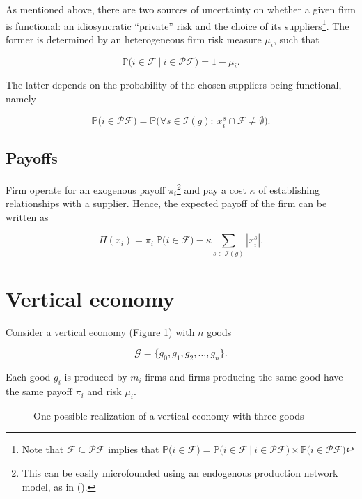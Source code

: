 \documentclass[american, abstract=on]{scrartcl}
\newcommand{\inputTikZ}[2]{%
      \scalebox{#1}{}  
    }
\newcommand{\F}{\mathcal{F}}
\newcommand{\G}{\mathcal{G}}
\newcommand{\I}{\mathcal{I}}
\newcommand{\PF}{\mathcal{P} \F}
\renewcommand{\P}{\mathbb{P}}
\newcommand{\abs}[1]{\left\lvert#1\right\rvert}
\newcommand{\citein}[1]{\citeauthor{#1} (\citeyear{#1})}
\begin{document}
As mentioned above, there are two sources of uncertainty on whether a given firm is functional: an idiosyncratic ``private'' risk and the choice of its suppliers\footnote{Note that $\F \subseteq \PF$ implies that $\P\Big(i \in \F \Big) = \P\Big(i \in \F \ \vert \ i \in \PF \Big) \times \P\Big( i \in \PF \Big)$}. The former is determined by an heterogeneous firm risk measure $\mu_i$, such that  

\begin{equation}
  \P\Big(i \in \F \ \vert \ i \in \PF \Big) = 1 - \mu_i.
\end{equation}

The latter depends on the probability of the chosen suppliers being functional, namely

\begin{equation}
  \P\Big( i \in \PF \Big) = \P\Big( \forall s \in \I(g): \ x_i^s \cap \F \neq \emptyset \Big).
\end{equation}

\subsection{Payoffs}

Firm operate for an exogenous payoff $\pi_i$\footnote{This can be easily microfounded using an endogenous production network model, as in \citein{acemoglu_endogenous_2020}.} and pay a cost $\kappa$ of establishing relationships with a supplier. Hence, the expected payoff of the firm can be written as

\begin{equation}
  \Pi(x_i) = \pi_i \ \P\Big( i \in \F \Big) - \kappa \sum_{s \in \I(g)} \abs{x^s_i}.
\end{equation}

\section{Vertical economy}

Consider a vertical economy (Figure \ref{fig:vertical}) with $n$ goods

\begin{equation}
  \G = \{g_0, g_1, g_2, \ldots, g_n\}.
\end{equation}

Each good $g_i$ is produced by $m_i$ firms and firms producing the same good have the same payoff $\pi_i$ and risk $\mu_i$.

\begin{figure}[H]
  \centering
  \inputTikZ{0.7}{diagrams/vertical-economy.tikz} 
  \caption{One possible realization of a vertical economy with three goods}
  \label{fig:vertical}
\end{figure}
\end{document}
